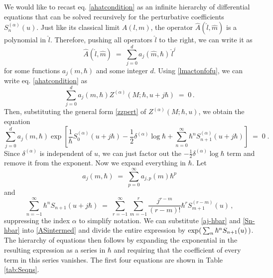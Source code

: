 \documentclass[hyper]{JHEP3}
\newcommand\be{\begin{equation}}
\newcommand\ee{\end{equation}}
\def\={\;=\;}
\begin{document}
We would like to recast eq. \eqref{ahatcondition} as an infinite hierarchy of differential
equations that can be solved recursively for the perturbative coefficients $S_n^{(\alpha)}(u)$.
Just like its classical limit $A(l,m)$, the operator $\widehat{A} (\hat l, \hat m )$
is a polynomial in $\hat l$.
Therefore, pushing all operators $\hat{l}$ to the right, we can write it as
\be
\widehat{A} (\hat{l},\hat{m}) \= \sum_{j=0}^d a_j (\hat{m},\hbar)\,\hat{l}^j
\label{hatAcoeffs}
\ee
for some functions $a_j (m,\hbar)$ and some integer $d$.
Using \eqref{lmactonfofu}, we can write eq. \eqref{ahatcondition} as
\be
\sum_{j=0}^d a_j(m,\hbar) Z^{(\alpha)} (M;\hbar,u + j \hbar ) \= 0\,.
\label{reccompJN}
\ee
Then, substituting the general form \eqref{zzpert} of $Z^{(\alpha)} (M;\hbar,u)$,
we obtain the equation
\be
\sum_{j=0}^d a_j(m,\hbar)
\exp \left[\frac{1}{\hbar} S_0^{(\alpha)} (u + j\hbar)
-\frac{1}{2} \delta^{(\alpha)} \log \hbar
+ \sum_{n=0}^{\infty} \hbar^n S_{n+1}^{(\alpha)} (u + j\hbar) \right] \= 0\;.
\label{ASintermed}
\ee
Since $\delta^{(\alpha)}$ is independent of $u$, we can just factor out
the $-\frac{1}{2}\delta^{(\alpha)} \log \hbar$ term and remove it from
the exponent.
Now we expand everything in $\hbar$. Let
\be
a_j (m,\hbar) \= \sum_{p=0}^{\infty} a_{j,p} (m) \hbar^p \label{aj-hbar}
\ee
and
\be
\sum_{n=-1}^{\infty} \hbar^n S_{n+1} ( u + j \hbar)
\= \sum_{r=-1}^{\infty} \sum_{m=-1}^r \frac{j^{r-m}}{(r-m)!} \hbar^r S_{m+1}^{(r-m)} (u)\,,
\label{Sn-hbar}
\ee
suppressing the index $\alpha$ to simplify notation.
We can substitute \eqref{aj-hbar} and \eqref{Sn-hbar}
into \eqref{ASintermed} and divide the entire expression by
$\exp\hspace{-.05cm}\left(\,\sum_n \hbar^n S_{n+1}(u)\,\right)$.
The hierarchy of equations then follows by expanding the exponential
in the resulting expression as a series in $\hbar$ and requiring that
the coefficient of every term in this series vanishes. The first four equations 
are shown in Table \ref{tab:Seqns}.
\end{document}
